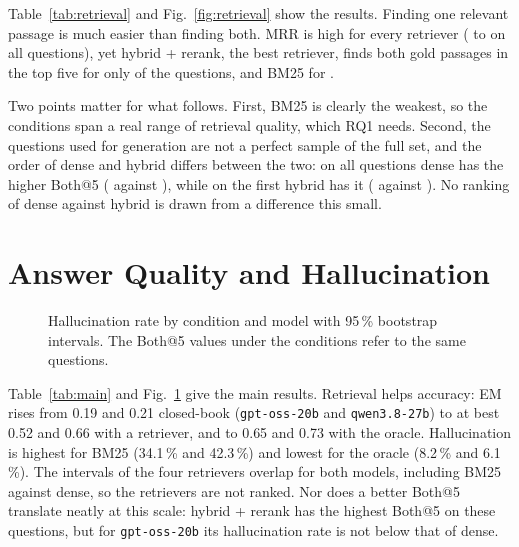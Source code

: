 Table~\ref{tab:retrieval} and Fig.~\ref{fig:retrieval} show the results. Finding one relevant passage is much
easier than finding both. MRR is high for every retriever ( to
 on all questions), yet hybrid + rerank, the best retriever, finds both gold
passages in the top five for only  of the questions, and BM25 for
.

Two points matter for what follows. First, BM25 is clearly the weakest, so the conditions span a real
range of retrieval quality, which RQ1 needs. Second, the  questions used for
generation are not a perfect sample of the full set, and the order of dense and hybrid differs between the two:
on all questions dense has the higher Both@5 ( against ), while
on the first  hybrid has it ( against ).
No ranking of dense against hybrid is drawn from a difference this small.

\section{Answer Quality and Hallucination}\label{sec:res-main}

\begin{table}[htbp]
\centering\small
\caption{Main results with judge \texttt{gemma-4-31b-it}. Abst.: answers the model itself declined. $n$: judged
answers. Hall.: hallucination rate with its 95\,\% bootstrap interval. Contr., Unsup.: shares of contradicted and
unsupported answers among the judged answers. Both@5 refers to the same  questions.}\label{tab:main}
\resizebox{\textwidth}{!}{}
\end{table}

\begin{figure}[htbp]
\centering
{}
\caption{Hallucination rate by condition and model with 95\,\% bootstrap intervals. The Both@5 values under the
conditions refer to the same  questions.}\label{fig:main}
\end{figure}

Table~\ref{tab:main} and Fig.~\ref{fig:main} give the main results. Retrieval helps accuracy: EM rises from 0.19 and
0.21 closed-book (\texttt{gpt-oss-20b} and \texttt{qwen3.8-27b}) to at best 0.52 and 0.66 with a retriever, and to
0.65 and 0.73 with the oracle. Hallucination is highest for BM25 (34.1\,\% and 42.3\,\%) and lowest for the oracle
(8.2\,\% and 6.1\,\%). The intervals of the four retrievers overlap for both models, including BM25 against dense,
so the retrievers are not ranked. Nor does a better Both@5 translate neatly at this scale: hybrid + rerank has the
highest Both@5 on these questions, but for \texttt{gpt-oss-20b} its hallucination rate is not below that of dense.

